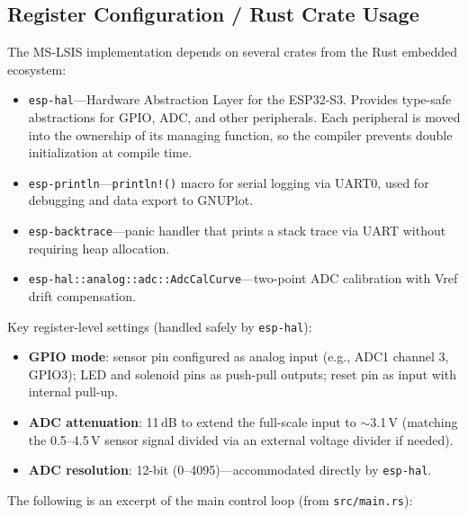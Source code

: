 \documentclass[11pt,a4paper]{article}
\begin{document}
\subsection*{Register Configuration / Rust Crate Usage}

The MS-LSIS implementation depends on several crates from the Rust embedded ecosystem:

\begin{itemize}[leftmargin=1.4em,itemsep=2pt]
\item \texttt{esp-hal}---Hardware Abstraction Layer for the ESP32-S3. Provides type-safe abstractions for GPIO, ADC, and other peripherals. Each peripheral is moved into the ownership of its managing function, so the compiler prevents double initialization at compile time.
\item \texttt{esp-println}---\texttt{println!()} macro for serial logging via UART0, used for debugging and data export to GNUPlot.
\item \texttt{esp-backtrace}---panic handler that prints a stack trace via UART without requiring heap allocation.
\item \texttt{esp-hal::analog::adc::AdcCalCurve}---two-point ADC calibration with Vref drift compensation.
\end{itemize}

Key register-level settings (handled safely by \texttt{esp-hal}):

\begin{itemize}[leftmargin=1.4em,itemsep=2pt]
\item \textbf{GPIO mode}: sensor pin configured as analog input (e.g., ADC1 channel 3, GPIO3); LED and solenoid pins as push-pull outputs; reset pin as input with internal pull-up.
\item \textbf{ADC attenuation}: 11\,dB to extend the full-scale input to $\sim$3.1\,V (matching the 0.5--4.5\,V sensor signal divided via an external voltage divider if needed).
\item \textbf{ADC resolution}: 12-bit (0--4095)---accommodated directly by \texttt{esp-hal}.
\end{itemize}

The following is an excerpt of the main control loop (from \texttt{src/main.rs}):
\end{document}

